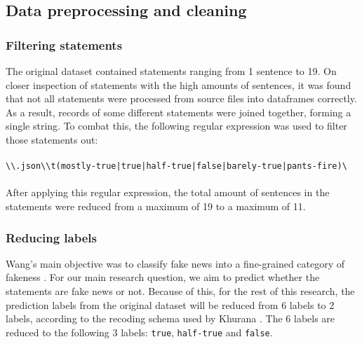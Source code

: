 \subsection{Data preprocessing and cleaning}
\subsubsection{Filtering statements}
The original dataset contained statements ranging from 1 sentence to 19. 
On closer inspection of statements with the high amounts of sentences, it was found that not all statements were processed from source files into dataframes correctly.
As a result, records of some different statements were joined together, forming a single string.
To combat this, the following regular expression was used to filter those statements out:\\
\\
\verb/\\.json\\t(mostly-true|true|half-true|false|barely-true|pants-fire)\/\\
\\
After applying this regular expression, the total amount of sentences in the statements were reduced from a maximum of 19 to a maximum of 11. 

\subsubsection{Reducing labels}

Wang's main objective was to classify fake news into a fine-grained category of fakeness \cite{wang2018}.
For our main research question, we aim to predict whether the statements are fake news or not. 
Because of this, for the rest of this research, the prediction labels from the original dataset will be reduced from 6 labels to 2 labels, according to the recoding schema used by Khurana \cite{khurana2017}.
The 6 labels are reduced to the following 3 labels: \texttt{true}, \texttt{half-true} and \texttt{false}.

